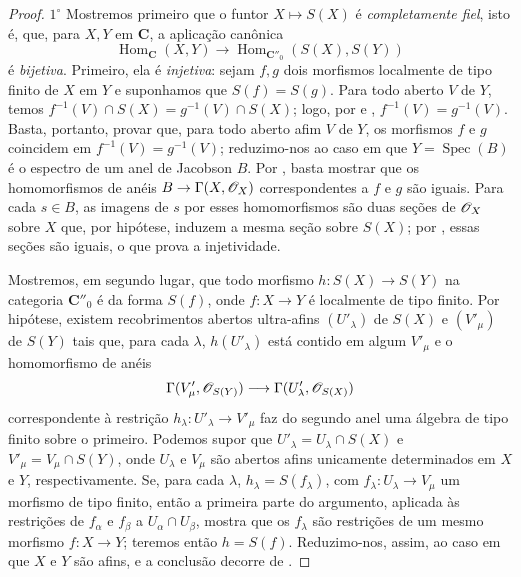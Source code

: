\begin{proof}
$1^\circ$ Mostremos primeiro que o funtor $X\mapsto S(X)$ é \emph{completamente fiel}, isto é, que, para $X,Y$ em $\mathbf{C}$, a aplicação canônica
\[
  \operatorname{Hom}_{\mathbf{C}}(X,Y)\longrightarrow
  \operatorname{Hom}_{\mathbf{C}''_0}(S(X),S(Y))
\]
é \emph{bijetiva}.
Primeiro, ela é \emph{injetiva}: sejam $f,g$ dois morfismos localmente de tipo finito de $X$ em $Y$ e suponhamos que $S(f)=S(g)$.
Para todo aberto $V$ de $Y$, temos $f^{-1}(V)\cap S(X)=g^{-1}(V)\cap S(X)$; logo, por  e , $f^{-1}(V)=g^{-1}(V)$.
Basta, portanto, provar que, para todo aberto afim $V$ de $Y$, os morfismos $f$ e $g$ coincidem em $f^{-1}(V)=g^{-1}(V)$; reduzimo-nos ao caso em que $Y=\operatorname{Spec}(B)$ é o espectro de um anel de Jacobson $B$.
Por , basta mostrar que os homomorfismos de anéis $B\to\Gamma(X,\sh{O}_X)$ correspondentes a $f$ e $g$ são iguais.
Para cada $s\in B$, as imagens de $s$ por esses homomorfismos são duas seções de $\mathscr{O}_X$ sobre $X$ que, por hipótese, induzem a mesma seção sobre $S(X)$; por , essas seções são iguais, o que prova a injetividade.

Mostremos, em segundo lugar, que todo morfismo $h:S(X)\to S(Y)$ na categoria $\mathbf{C}''_0$ é da forma $S(f)$, onde $f:X\to Y$ é localmente de tipo finito.
Por hipótese, existem recobrimentos abertos ultra-afins $(U'_\lambda)$ de $S(X)$ e $(V'_\mu)$ de $S(Y)$ tais que, para cada $\lambda$, $h(U'_\lambda)$ está contido em algum $V'_\mu$ e o homomorfismo de anéis
\[
  \Gamma(V'_\mu,\mathscr{O}_{S(Y)})\longrightarrow
  \Gamma(U'_\lambda,\mathscr{O}_{S(X)})
\]
correspondente à restrição $h_\lambda:U'_\lambda\to V'_\mu$ faz do segundo anel uma álgebra de tipo finito sobre o primeiro.
Podemos supor que $U'_\lambda=U_\lambda\cap S(X)$ e $V'_\mu=V_\mu\cap S(Y)$, onde $U_\lambda$ e $V_\mu$ são abertos afins unicamente determinados em $X$ e $Y$, respectivamente.
Se, para cada $\lambda$, $h_\lambda=S(f_\lambda)$, com $f_\lambda:U_\lambda\to V_\mu$ um morfismo de tipo finito, então a primeira parte do argumento, aplicada às restrições de $f_\alpha$ e $f_\beta$ a $U_\alpha\cap U_\beta$, mostra que os $f_\lambda$ são restrições de um mesmo morfismo $f:X\to Y$; teremos então $h=S(f)$.
Reduzimo-nos, assim, ao caso em que $X$ e $Y$ são afins, e a conclusão decorre de .


\end{proof}

